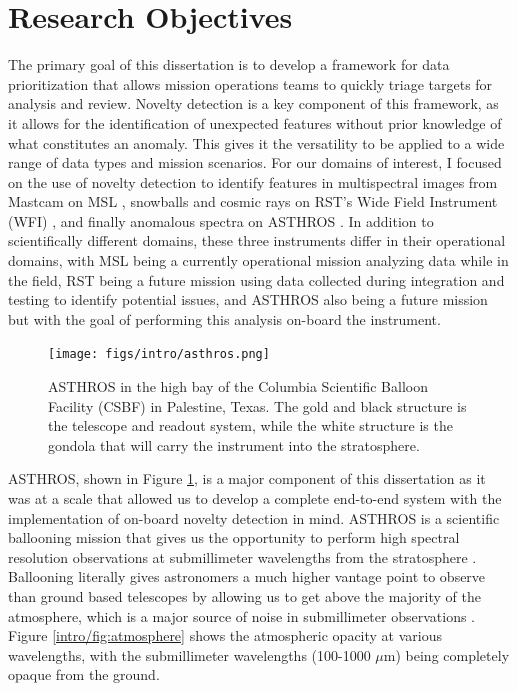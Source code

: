 \section{Research Objectives}
The primary goal of this dissertation is to develop a framework for data prioritization that allows mission operations teams to quickly triage targets for analysis and review.
Novelty detection is a key component of this framework, as it allows for the identification of unexpected features without prior knowledge of what constitutes an anomaly.
This gives it the versatility to be applied to a wide range of data types and mission scenarios.
For our domains of interest, I focused on the use of novelty detection to identify features in multispectral images from Mastcam on MSL \cite{horton2021integrating}, snowballs and cosmic rays on RST's Wide Field Instrument (WFI) \cite{horton2024anomaly}, and finally anomalous spectra on ASTHROS \cite{horton2024board}.
In addition to scientifically different domains, these three instruments differ in their operational domains, with MSL being a currently operational mission analyzing data while in the field, RST being a future mission using data collected during integration and testing to identify potential issues, and ASTHROS also being a future mission but with the goal of performing this analysis on-board the instrument.

\begin{figure}
\centering
\texttt{[image: figs/intro/asthros.png]}
\caption[The Astrophysics Stratospheric Telescope for High Spectral Resolution Observations at Submillimeter-wavelengths (ASTHROS)]{
    ASTHROS in the high bay of the Columbia Scientific Balloon Facility (CSBF) in Palestine, Texas. 
    The gold and black structure is the telescope and readout system, while the white structure is the gondola that will carry the instrument into the stratosphere. 
}
\label{intro/fig:asthros}
\end{figure}

ASTHROS, shown in Figure \ref{intro/fig:asthros}, is a major component of this dissertation as it was at a scale that allowed us to develop a complete end-to-end system with the implementation of on-board novelty detection in mind. 
ASTHROS is a scientific ballooning mission that gives us the opportunity to perform high spectral resolution observations at submillimeter wavelengths from the stratosphere \parencite{siles2020asthros}.
Ballooning literally gives astronomers a much higher vantage point to observe than ground based telescopes by allowing us to get above the majority of the atmosphere, which is a major source of noise in submillimeter observations \cite{yajima2009scientific}.
Figure \ref{intro/fig:atmosphere} shows the atmospheric opacity at various wavelengths, with the submillimeter wavelengths (100-1000 $\mu$m) being completely opaque from the ground.

